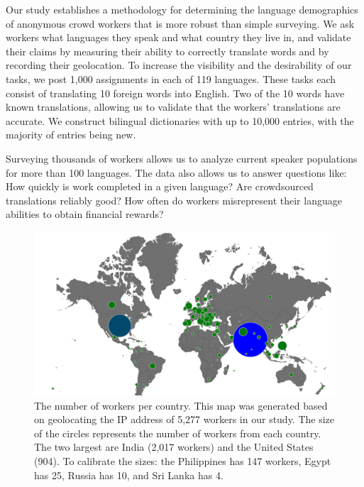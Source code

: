 \documentclass[11pt]{article}
\begin{document}
Our study establishes a methodology for determining the language demographics of anonymous crowd workers that is more robust than simple surveying. We ask workers what languages they speak and what country they live in, and validate their claims by measuring their ability to correctly translate words and by recording their geolocation.  To increase the visibility and the desirability of our tasks, we post 1,000 assignments in each of 119 languages.  These tasks each consist of translating 10 foreign words into English.  Two of the 10 words have known translations, allowing us to validate that the workers' translations are accurate.  We construct bilingual dictionaries with up to 10,000 entries, with the majority of entries being new. 

Surveying thousands of workers allows us to analyze current speaker populations for more than 100 languages.  The data also allows us to answer questions like: 
How quickly is work completed in a given language? 
Are crowdsourced translations reliably good? 
How often do workers misrepresent their language abilities to obtain financial rewards? 

\begin{figure}[h]
\centering
\includegraphics[width=\linewidth]{../version1-figures/map.png}
\caption{The number of workers per country.  This map was generated based on geolocating the IP address of  5,277 workers in our study.  The size of the circles represents the number of workers from each country.  The two largest are India (2,017 workers) and the United States (904).  To calibrate the sizes: the Philippines has 147 workers, Egypt has 25, Russia has 10, and Sri Lanka has 4.}
\label{map}
\end{figure}
\end{document}
